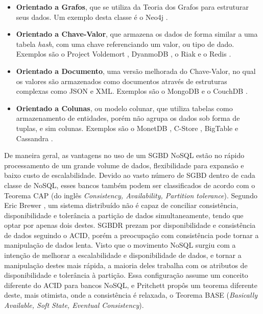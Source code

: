 \begin{itemize}
    \item{\textbf{Orientado a Grafos}}, que se utiliza da Teoria dos Grafos para estruturar seus dados. 
    Um exemplo desta classe é o Neo4j \cite{neo2018nosql}.
    \item{\textbf{Orientado a Chave-Valor}}, que armazena os dados de forma similar a uma tabela \textit{hash}, 
    com uma chave referenciando um valor, ou tipo de dado. Exemplos são o Project Voldemort \cite{voldemort2018nosql}, 
    DyanmoDB \cite{amazon2018nosql}, o Riak \cite{riak2018nosql} e o Redis \cite{redis2018nosql}.
    \item{\textbf{Orientado a Documento}}, uma versão melhorada do Chave-Valor, 
    no qual os valores são armazenados como documentos através de estruturas complexas como JSON e XML. 
    Exemplos são o MongoDB \cite{mongo2018nosql} e o CouchDB \cite{couch2018nosql}.
    \item{\textbf{Orientado a Colunas}}, ou modelo colunar, 
    que utiliza tabelas como armazenamento de entidades, 
    porém não agrupa os dados sob forma de tuplas, e sim colunas. Exemplos são o MonetDB \cite{monetdb2017c}, C-Store \cite{cstore2018nosql}, BigTable \cite{google2018nosql} e Cassandra \cite{cassandra2018nosql}.
\end{itemize}

De maneira geral, as vantagens no uso de um SGBD NoSQL estão no rápido processamento de um grande volume de dados, flexibilidade para expansão e baixo custo de escalabilidade. Devido ao vasto número de SGBD dentro de cada classe de NoSQL, esses bancos também podem ser classificados de acordo com o Teorema CAP (do inglês \textit{Consistency, Availability, Partition tolerance}). Segundo Eric Brewer \cite{brewer2000towards, gilbert2002brewer}, um sistema distribuído não é 
capaz de conciliar consistência, disponibilidade e tolerância a partição de dados simultaneamente, tendo que optar por apenas dois destes. 
SGBDR prezam por disponibilidade e consistência de dados seguindo o ACID, porém a preocupação com consistência 
pode tornar a manipulação de dados lenta. Visto que o movimento NoSQL surgiu com a intenção de 
melhorar a escalabilidade e disponibilidade de dados, e tornar a manipulação destes mais rápida, 
a maioria deles trabalha com os atributos de disponibilidade e tolerância à partição. 
Essa configuração assume um conceito diferente do ACID para bancos NoSQL, e Pritchett \cite{pritchett2008base} propôs um teorema diferente deste, mais otimista, onde a consistência é relaxada, o Teorema BASE (\textit{Basically Available, Soft State, Eventual Consistency}).

